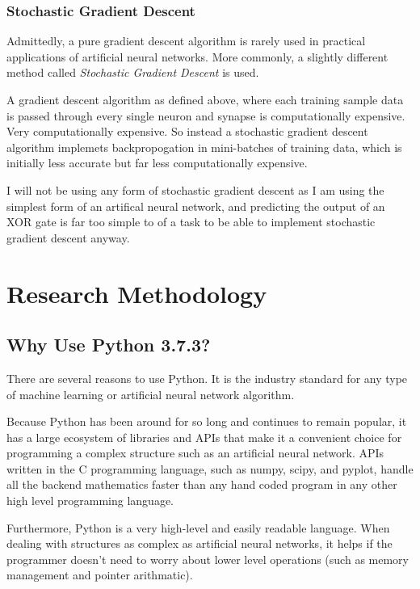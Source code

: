 \documentclass[12pt]{article}
\begin{document}
\subsubsection{Stochastic Gradient Descent}

Admittedly, a pure gradient descent algorithm is rarely used in practical applications of artificial neural networks. More commonly, a slightly different method called \textit{Stochastic Gradient Descent} is used.

A gradient descent algorithm as defined above, where each training sample data is passed through every single neuron and synapse is computationally expensive. Very computationally expensive. So instead a stochastic gradient descent algorithm implemets backpropogation in mini-batches of training data, which is initially less accurate but far less computationally expensive.

I will not be using any form of stochastic gradient descent as I am using the simplest form of an artifical neural network, and predicting the output of an XOR gate is far too simple to of a task to be able to implement stochastic gradient descent anyway.

\section{Research Methodology \label{methodology}}


\subsection{Why Use Python 3.7.3?}

There are several reasons to use Python. It is the industry standard for any type of machine learning or artificial neural network algorithm.

Because Python has been around for so long and continues to remain popular, it has a large ecosystem of libraries and APIs that make it a convenient choice for programming a complex structure such as an artificial neural network. APIs written in the C programming language, such as numpy, scipy, and pyplot, handle all the backend mathematics faster than any hand coded program in any other high level programming language.

Furthermore, Python is a very high-level and easily readable language. When dealing with structures as complex as artificial neural networks, it helps if the programmer doesn't need to worry about lower level operations (such as memory management and pointer arithmatic).
\end{document}
